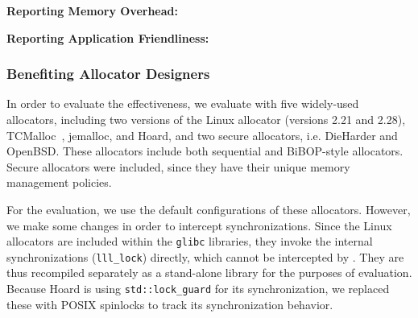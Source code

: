 \begin{table}[h]
  \centering
  \footnotesize
  \setlength{\tabcolsep}{0.2em}
\begin{tabular}{l|r|r|r|r|}
\hline
\end{tabular}
\end{table}


  

\textbf{Reporting Memory Overhead:} 


\textbf{Reporting Application Friendliness:} 

\subsubsection{Benefiting Allocator Designers}
In order to evaluate the effectiveness, we evaluate \MP{} with five widely-used allocators, including two versions of the Linux allocator (versions 2.21 and 2.28), TCMalloc~\cite{tcmalloc}, jemalloc, and Hoard, and two secure allocators, i.e. DieHarder and OpenBSD. These allocators include both sequential and BiBOP-style allocators. Secure allocators were included, since they have their unique memory management policies. 

For the evaluation, we use the default configurations of these allocators. However, we make some changes in order to  intercept synchronizations. Since the Linux allocators are included within the \texttt{glibc} libraries, they invoke the internal synchronizations (\texttt{lll\_lock}) directly, which cannot be intercepted by \MP{}. They are thus recompiled separately as a stand-alone library for the purposes of evaluation. Because Hoard is using \texttt{std::lock\_guard} for its synchronization, we replaced these with POSIX spinlocks to track its synchronization behavior.



 





